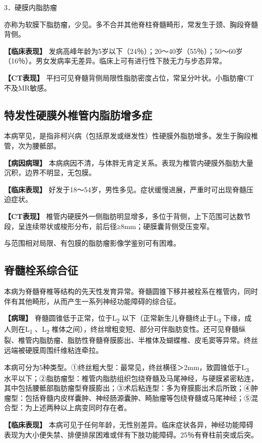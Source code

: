 3．硬膜内脂肪瘤

亦称为软膜下脂肪瘤，少见。多不合并其他脊柱脊髓畸形，常发生于颈、胸段脊髓背侧。

\textbf{【临床表现】}
发病高峰年龄为5岁以下（24％）；20～40岁（55％）；50～60岁（16％）。男女发病率无差异。临床上可有进行性下肢无力与步态异常。

\textbf{【CT表现】}
平扫可见脊髓背侧局限性脂肪密度占位，常呈分叶状。小脂肪瘤CT不及MR敏感。

\subsection{特发性硬膜外椎管内脂肪增多症}

本病罕见，是指非柯兴病（包括原发或继发性）性硬膜外脂肪增多。发生于胸段椎管，次为腰骶部。

\textbf{【病因病理】}
本病病因不清，与体胖无肯定关系。表现为椎管内硬膜外脂肪大量沉积，边界不明显，无包膜。

\textbf{【临床表现】}
好发于18～54岁，男性多见。症状缓慢进展，严重时可出现脊髓压迫症状。

\textbf{【CT表现】}
椎管内硬膜外一侧脂肪明显增多，多位于背侧，上下范围可达数节段，呈连续带状或梭形分布，前后径≥8mm；硬膜囊背侧受压变窄。

与范围相对局限、有包膜的脂肪瘤影像学鉴别可有困难。

\subsection{脊髓栓系综合征}

本病为脊髓脊椎等结构的先天性发育异常。脊髓圆锥下移并被栓系在椎管内，同时伴有其他畸形，从而产生一系列神经功能障碍的综合征。

\textbf{【病理】} 脊髓圆锥低于正常，位于L\textsubscript{2}
以下（正常新生儿脊髓终止于L\textsubscript{3}
下缘，成人则在L\textsubscript{1} 、L\textsubscript{2}
椎体之间），终丝增粗变短、部分可伴脂肪变性。还可见脊髓纵裂、椎管内脂肪瘤、脂肪性脊髓脊膜膨出、半椎体及蝴蝶椎、皮毛窦等异常。终丝远端被硬膜周围纤维粘连牵拉。

本病可分为5种类型。①终丝粗大型：最常见，终丝横径＞2mm，致圆锥低于L\textsubscript{3}
水平以下；②脂肪瘤型：椎管内脂肪组织包绕脊髓及马尾神经，与硬膜紧密粘连，其中包括腰骶部脂肪瘤型脊膜膨出；③术后粘连型：多为脊膜膨出术后所致；④肿瘤型：包括脊髓内皮样囊肿、神经肠源囊肿、畸胎瘤等包绕脊髓或马尾神经；⑤混合型：为上述两种以上病变同时存在者。

\textbf{【临床表现】}
本病可见于任何年龄，无性别差异。临床症状各异，神经功能障碍表现为大小便失禁、排便排尿困难或伴有下肢功能障碍。25％有脊柱前突或后突。

